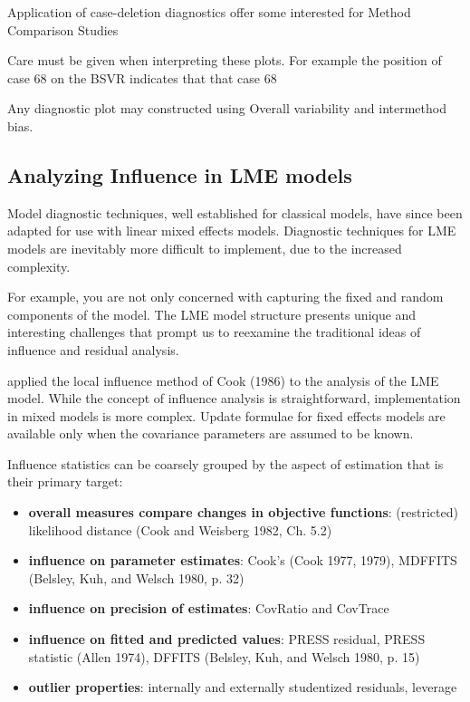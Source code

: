 \documentclass[12pt, a4paper]{report}
\theoremstyle{plain}
\theoremstyle{definition}
\theoremstyle{remark}
\begin{document}
Application of case-deletion diagnostics offer some interested for Method Comparison Studies


Care must be given when interpreting these plots. For example the position of case 68 on the BSVR indicates that that
case 68



Any diagnostic plot may constructed using Overall variability and intermethod bias.


\subsection{Analyzing Influence in LME models}

Model diagnostic techniques, well established for classical models, have since been adapted for use with linear mixed effects models. Diagnostic techniques for LME models are inevitably more difficult to implement, due to the increased complexity.



For example, you are not only concerned with capturing the fixed and random components of the model. The LME model structure presents unique and interesting challenges that prompt us to reexamine the traditional ideas of influence and residual analysis.





\citet{Beckman} applied the local influence method of Cook (1986) to the analysis of the LME model.
While the concept of influence analysis is straightforward, implementation in mixed models is more complex. Update formulae for fixed effects models are available only when the covariance parameters are assumed to be known.




Influence statistics can be coarsely grouped by the aspect of estimation that is their primary target:
\begin{itemize}
	\item \textbf{overall measures compare changes in objective functions}: (restricted) likelihood distance (Cook and Weisberg 1982, Ch. 5.2)
	\item \textbf{influence on parameter estimates}: Cook's  (Cook 1977, 1979), MDFFITS (Belsley, Kuh, and Welsch 1980, p. 32)
	\item \textbf{influence on precision of estimates}: CovRatio and CovTrace
	\item \textbf{influence on fitted and predicted values}: PRESS residual, PRESS statistic (Allen 1974), DFFITS (Belsley, Kuh, and Welsch 1980, p. 15)
	\item \textbf{outlier properties}: internally and externally studentized residuals, leverage
\end{itemize}
\end{document}
